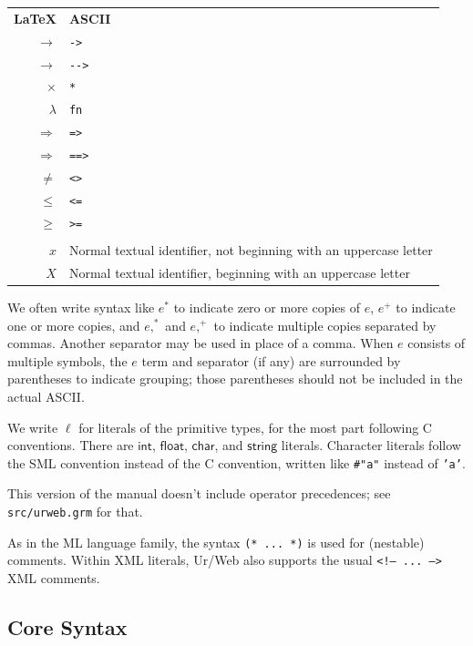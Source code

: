 \documentclass{article}
\newcommand{\cd}[1]{\texttt{#1}}
\newcommand{\mt}[1]{\mathsf{#1}}
\begin{document}
\begin{center}
  \begin{tabular}{rl}
    \textbf{\LaTeX} & \textbf{ASCII} \\
    $\to$ & \cd{->} \\
    $\longrightarrow$ & \cd{-{}->} \\
    $\times$ & \cd{*} \\
    $\lambda$ & \cd{fn} \\
    $\Rightarrow$ & \cd{=>} \\
    $\Longrightarrow$ & \cd{==>} \\
    $\neq$ & \cd{<>} \\
    $\leq$ & \cd{<=} \\
    $\geq$ & \cd{>=} \\
    \\
    $x$ & Normal textual identifier, not beginning with an uppercase letter \\
    $X$ & Normal textual identifier, beginning with an uppercase letter \\
  \end{tabular}
\end{center}

We often write syntax like $e^*$ to indicate zero or more copies of $e$, $e^+$ to indicate one or more copies, and $e,^*$ and $e,^+$ to indicate multiple copies separated by commas.  Another separator may be used in place of a comma.  When $e$ consists of multiple symbols, the $e$ term and separator (if any) are surrounded by parentheses to indicate grouping; those parentheses should not be included in the actual ASCII.

We write $\ell$ for literals of the primitive types, for the most part following C conventions.  There are $\mt{int}$, $\mt{float}$, $\mt{char}$, and $\mt{string}$ literals.  Character literals follow the SML convention instead of the C convention, written like \texttt{\#"a"} instead of \texttt{'a'}.

This version of the manual doesn't include operator precedences; see \texttt{src/urweb.grm} for that.

As in the ML language family, the syntax \texttt{(* ... *)} is used for (nestable) comments.  Within XML literals, Ur/Web also supports the usual \texttt{<!-- ... -->} XML comments.

\subsection{\label{core}Core Syntax}
\end{document}
